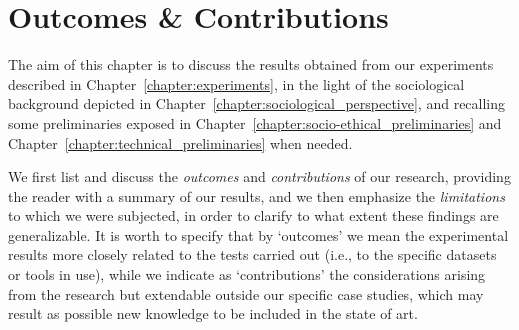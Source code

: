 \chapter{Outcomes \& Contributions}
\label{chapter:outcomes_contributions}
\thispagestyle{empty}

The aim of this chapter is to discuss the results obtained from our experiments described in Chapter~\ref{chapter:experiments}, in the light of the sociological background depicted in Chapter~\ref{chapter:sociological_perspective}, and recalling some preliminaries exposed in Chapter~\ref{chapter:socio-ethical_preliminaries} and Chapter~\ref{chapter:technical_preliminaries} when needed.

We first list and discuss the \textit{outcomes} and \textit{contributions} of our research, providing the reader with a summary of our results, and we then emphasize the \textit{limitations} to which we were subjected, in order to clarify to what extent these findings are generalizable. It is worth to specify that by `outcomes' we mean the experimental results more closely related to the tests carried out (i.e., to the specific datasets or tools in use), while we indicate as `contributions' the considerations arising from the research but extendable outside our specific case studies, which may result as possible new knowledge to be included in the state of art.


